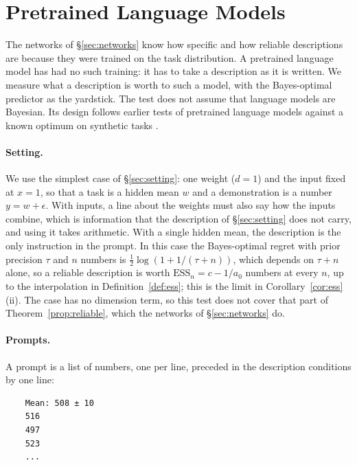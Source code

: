 \documentclass[10pt]{article}
\newcommand{\ess}{\mathrm{ESS}}
\begin{document}
\section{Pretrained Language Models}\label{sec:llm}
The networks of \S\ref{sec:networks} know how specific and how reliable descriptions are because they were trained on the task distribution. A pretrained language model has had no such training: it has to take a description as it is written. We measure what a description is worth to such a model, with the Bayes-optimal predictor as the yardstick. The test does not assume that language models are Bayesian. Its design follows earlier tests of pretrained language models against a known optimum on synthetic tasks \citep{gupta2025, akata2026}.

\paragraph{Setting.} We use the simplest case of \S\ref{sec:setting}: one weight ($d = 1$) and the input fixed at $x = 1$, so that a task is a hidden mean $w$ and a demonstration is a number $y = w + \epsilon$. With inputs, a line about the weights must also say how the inputs combine, which is information that the description of \S\ref{sec:setting} does not carry, and using it takes arithmetic. With a single hidden mean, the description is the only instruction in the prompt. In this case the Bayes-optimal regret with prior precision $\tau$ and $n$ numbers is $\tfrac12 \log(1 + 1/(\tau + n))$, which depends on $\tau + n$ alone, so a reliable description is worth $\ess_n = c - 1/a_0$ numbers at every $n$, up to the interpolation in Definition~\ref{def:ess}; this is the limit in Corollary~\ref{cor:ess}(ii). The case has no dimension term, so this test does not cover that part of Theorem~\ref{prop:reliable}, which the networks of \S\ref{sec:networks} do.

\paragraph{Prompts.} A prompt is a list of numbers, one per line, preceded in the description conditions by one line:

\smallskip\noindent\begin{minipage}{\linewidth}
\begin{verbatim}
    Mean: 508 ± 10
    516
    497
    523
    ...
\end{verbatim}
\end{minipage}
\smallskip
\end{document}
